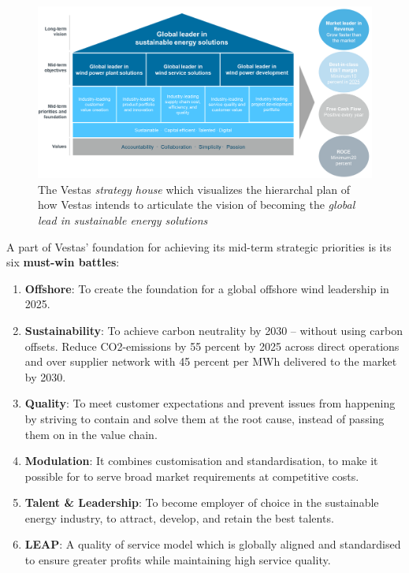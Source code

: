 \begin{figure}[ht]
	\centering
	\includegraphics[width=0.85\linewidth]{Graphics/vestasStrategyHouse.png}
	\caption{The Vestas \textit{strategy house} which visualizes the hierarchal plan of how Vestas intends to articulate the vision of becoming the \textit{global lead in sustainable energy solutions}}
	\label{fig:vestas_strategy_house}
\end{figure}

\noindent A part of Vestas' foundation for achieving its mid-term strategic priorities is its six \textbf{must-win battles}:
\begin{enumerate}
	\item \textbf{Offshore}: To create the foundation for a global offshore wind leadership in 2025.
	\item \textbf{Sustainability}: To achieve carbon neutrality by 2030 – without using carbon offsets. Reduce CO2-emissions by 55 percent by 2025 across direct operations and over supplier network with 45 percent per MWh delivered to the market by 2030.
	\item \textbf{Quality}: To meet customer expectations and prevent issues from happening by striving to contain and solve them at the root cause, instead of passing them on in the value chain.
	\item \textbf{Modulation}: It combines customisation and standardisation, to make it possible for to serve broad market requirements at competitive costs.
	\item \textbf{Talent \& Leadership}: To become employer of choice in the sustainable energy industry, to attract, develop, and retain the best talents.
	\item \textbf{LEAP}: A quality of service model which is globally aligned and standardised to ensure greater profits while maintaining high service quality.
\end{enumerate}

